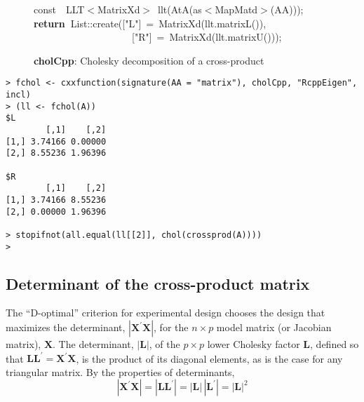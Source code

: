 \documentclass[shortnames,article]{jss}
\newcommand{\hlstd}[1]{\textcolor[rgb]{0,0,0}{#1}}
\newcommand{\hlopt}[1]{\textcolor[rgb]{0,0,0}{#1}}
\newcommand{\hlstr}[1]{\textcolor[rgb]{0.90,0.15,0.15}{#1}}
\newcommand{\hlkwa}[1]{\textcolor[rgb]{0.61,0.13,0.93}{\bf{#1}}}
\newcommand{\hlkwb}[1]{\textcolor[rgb]{0.13,0.54,0.13}{#1}}
\newcommand{\hlkwd}[1]{\textcolor[rgb]{0,0,0}{#1}}
\begin{document}
\begin{figure}[htb]
  \noindent
  \ttfamily
  \hlstd{}\hlkwb{const}\hlstd{\ \ }\hlkwb{}\hlstd{LLT}\hlopt{$<$}\hlstd{MatrixXd}\hlopt{$>$\ }\hlstd{}\hlkwd{llt}\hlstd{}\hlopt{(}\hlstd{}\hlkwd{AtA}\hlstd{}\hlopt{(}\hlstd{as}\hlopt{$<$}\hlstd{MapMatd}\hlopt{$>$(}\hlstd{AA}\hlopt{)));}\hspace*{\fill}\\
  \hlstd{}\hlkwa{return\ }\hlstd{List}\hlopt{::}\hlstd{}\hlkwd{create}\hlstd{}\hlopt{(}\hlstd{\textunderscore }\hlopt{{[}}\hlstd{}\hlstr{"L"}\hlstd{}\hlopt{{]}\ =\ }\hlstd{}\hlkwd{MatrixXd}\hlstd{}\hlopt{(}\hlstd{llt}\hlopt{.}\hlstd{}\hlkwd{matrixL}\hlstd{}\hlopt{()),}\hspace*{\fill}\\
  \hlstd{}\hlstd{\ \ \ \ \ \ \ \ \ \ \ \ \ \ \ \ \ \ \ \ }\hlstd{\textunderscore }\hlopt{{[}}\hlstd{}\hlstr{"R"}\hlstd{}\hlopt{{]}\ =\ }\hlstd{}\hlkwd{MatrixXd}\hlstd{}\hlopt{(}\hlstd{llt}\hlopt{.}\hlstd{}\hlkwd{matrixU}\hlstd{}\hlopt{()));}\hlstd{}\hspace*{\fill}\\
  \mbox{}
  \normalfont
  \normalsize
  \caption{\textbf{cholCpp}: Cholesky decomposition of a cross-product}
  \label{chol}
\end{figure}

\begin{verbatim}
> fchol <- cxxfunction(signature(AA = "matrix"), cholCpp, "RcppEigen", incl)
> (ll <- fchol(A))
$L
        [,1]    [,2]
[1,] 3.74166 0.00000
[2,] 8.55236 1.96396

$R
        [,1]    [,2]
[1,] 3.74166 8.55236
[2,] 0.00000 1.96396

> stopifnot(all.equal(ll[[2]], chol(crossprod(A))))
> 
\end{verbatim}



\subsection{Determinant of the cross-product matrix}
\label{sec:determinant}

The ``D-optimal'' criterion for experimental design chooses the design
that maximizes the determinant, $|\bm X^\prime\bm X|$, for the
$n\times p$ model matrix (or Jacobian matrix), $\bm X$.  The
determinant, $|\bm L|$, of the $p\times p$ lower Cholesky factor
$\bm L$, defined so that $\bm L\bm L^\prime=\bm X^\prime\bm X$, is
the product of its diagonal elements, as is the case for any
triangular matrix.  By the properties of determinants,
\begin{displaymath}
  |\bm X^\prime\bm X|=|\bm L\bm L^\prime|=|\bm L|\,|\bm L^\prime|=|\bm L|^2
\end{displaymath}
\end{document}

